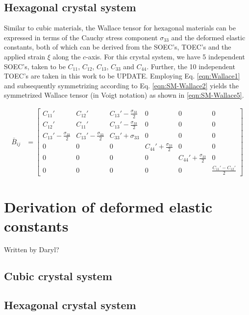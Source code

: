 \documentclass[showpacs,aps,floatfix,prb,reprint,superscriptaddress,onecolumn]{revtex4-1}
\begin{document}
\subsection{Hexagonal crystal system}
Similar to cubic materials, the Wallace tensor for hexagonal materials can be expressed in terms of the Cauchy stress component $\sigma_{33}$ and the deformed elastic constants, both of which can be derived from the SOEC's, TOEC's and the applied strain $\xi$ along the $c$-axis. For this crystal system, we have 5 independent SOEC's, taken to be $C_{11}$, $C_{12}$, $C_{13}$, $C_{33}$ and $C_{44}$. Further, the 10 independent TOEC's are taken in this work to be UPDATE. Employing Eq. \ref{eqn:Wallace1} and subsequently symmetrizing according to Eq. \ref{eqn:SM-Wallace2} yields the symmetrized Wallace tensor (in Voigt notation) as shown in \ref{eqn:SM-Wallace5}.


\begin{equation}
\label{eqn:SM-Wallace5}
  \begin{aligned}
        \bar{B}_{ij}&=\begin{bmatrix} C_{11}' & C_{12}' & C_{13}'-\frac{\sigma_{33}}{2} & 0 & 0 & 0 \\ C_{12}' & C_{11}' & C_{13}'-\frac{\sigma_{33}}{2} & 0 & 0 & 0 \\ C_{13}'-\frac{\sigma_{33}}{2} & C_{13}'-\frac{\sigma_{33}}{2} & C_{33}'+\sigma_{33} & 0 & 0 & 0 \\ 0 & 0 & 0 & C_{44}'+\frac{\sigma_{33}}{2} & 0 & 0 \\ 0 & 0 & 0 & 0 & C_{44}'+\frac{\sigma_{33}}{2} & 0 \\ 0 & 0 & 0 & 0 & 0 & \frac{C_{11}'-C_{12}'}{2} \end{bmatrix}
       \end{aligned}
\end{equation} 


\section{Derivation of deformed elastic constants}
Written by Daryl?

\subsection{Cubic crystal system}

\subsection{Hexagonal crystal system}
\end{document}
